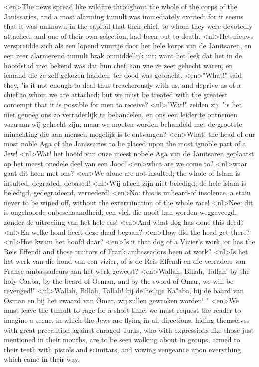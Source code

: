 <en>The news spread like wildfire throughout the whole of the corps of the Janissaries, and a most alarming tumult was immediately excited: for it seems that it was unknown in the capital that their chief, to whom they were devotedly attached, and one of their own selection, had been put to death.
<nl>Het nieuws verspreidde zich als een lopend vuurtje door het hele korps van de Janitsaren, en een zeer alarmerend tumult brak onmiddellijk uit: want het leek dat het in de hoofdstad niet bekend was dat hun chef, aan wie ze zeer gehecht waren, en iemand die ze zelf gekozen hadden, ter dood was gebracht.
<en>"What!" said they, "is it not enough to deal thus treacherously with us, and deprive us of a chief to whom we are attached; but we must be treated with the greatest contempt that it is possible for men to receive?
<nl>"Wat!" zeiden zij: "is het niet genoeg ons zo verraderlijk  te behandelen, en ons een leider te ontnemen waaraan wij gehecht zijn; maar we moeten worden behandeld met de grootste minachting die aan mensen  mogelijk is te ontvangen?
<en>What! the head of our most noble Aga of the Janissaries to be placed upon the most ignoble part of a Jew!
<nl>Wat! het hoofd van onze meest nobele Aga van de Janitsaren geplaatst op het meest onedele deel van een Jood!
<en>what are we come to?
<nl>waar gaat dit heen met ons?
<en>We alone are not insulted; the whole of Islam is insulted, degraded, debased!
<nl>Wij alleen zijn niet beledigd; de hele islam is beledigd, gedegradeerd, vernederd!
<en>No: this is unheard-of insolence, a stain never to be wiped off, without the extermination of the whole race!
<nl>Nee: dit is ongehoorde onbeschaamdheid, een vlek die nooit kan worden weggeveegd, zonder de uitroeiing van het hele ras!
<en>And what dog has done this deed?
<nl>En welke hond heeft deze daad begaan?
<en>How did the head get there?
<nl>Hoe kwam het hoofd daar?
<en>Is it that dog of a Vizier's work, or has the Reis Effendi and those traitors of Frank ambassadors been at work?
<nl>Is het het werk van die hond van een vizier, of is de Reis Effendi en die verraders van Franse ambassadeurs aan het werk geweest?
<en>Wallah, Billah, Tallah! by the holy Caaba, by the beard of Osman, and by the sword of Omar, we will be revenged!"
<nl>Wallah, Billah, Tallah! bij  de heilige Ka"aba, bij de baard van Osman en bij het zwaard van Omar, wij zullen gewroken worden! "
<en>We must leave the tumult to rage for a short time; we must request the reader to imagine a scene, in which the Jews are flying in all directions, hiding themselves with great precaution against enraged Turks, who with expressions like those just mentioned in their mouths, are to be seen walking about in groups, armed to their teeth with pistols and scimitars, and vowing vengeance upon everything which came in their way.
